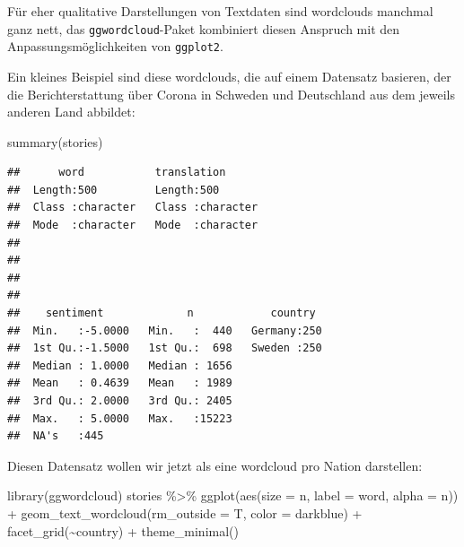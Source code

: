 \documentclass[
]{book}
\newenvironment{Shaded}{\begin{snugshade}}{\end{snugshade}}
\newcommand{\AttributeTok}[1]{\textcolor[rgb]{0.77,0.63,0.00}{#1}}
\newcommand{\FunctionTok}[1]{\textcolor[rgb]{0.00,0.00,0.00}{#1}}
\newcommand{\NormalTok}[1]{#1}
\newcommand{\SpecialCharTok}[1]{\textcolor[rgb]{0.00,0.00,0.00}{#1}}
\newcommand{\StringTok}[1]{\textcolor[rgb]{0.31,0.60,0.02}{#1}}
\begin{document}
Für eher qualitative Darstellungen von Textdaten sind wordclouds manchmal ganz nett, das \texttt{ggwordcloud}-Paket kombiniert diesen Anspruch mit den Anpassungsmöglichkeiten von \texttt{ggplot2}.

Ein kleines Beispiel sind diese wordclouds, die auf einem Datensatz basieren, der die Berichterstattung über Corona in Schweden und Deutschland aus dem jeweils anderen Land abbildet:

\begin{Shaded}
\begin{Highlighting}[]
\FunctionTok{summary}\NormalTok{(stories)}
\end{Highlighting}
\end{Shaded}

\begin{verbatim}
##      word           translation       
##  Length:500         Length:500        
##  Class :character   Class :character  
##  Mode  :character   Mode  :character  
##                                       
##                                       
##                                       
##                                       
##    sentiment             n            country   
##  Min.   :-5.0000   Min.   :  440   Germany:250  
##  1st Qu.:-1.5000   1st Qu.:  698   Sweden :250  
##  Median : 1.0000   Median : 1656                
##  Mean   : 0.4639   Mean   : 1989                
##  3rd Qu.: 2.0000   3rd Qu.: 2405                
##  Max.   : 5.0000   Max.   :15223                
##  NA's   :445
\end{verbatim}

Diesen Datensatz wollen wir jetzt als eine wordcloud pro Nation darstellen:

\begin{Shaded}
\begin{Highlighting}[]
\FunctionTok{library}\NormalTok{(ggwordcloud)}
\NormalTok{stories }\SpecialCharTok{\%\textgreater{}\%} 
  \FunctionTok{ggplot}\NormalTok{(}\FunctionTok{aes}\NormalTok{(}\AttributeTok{size =}\NormalTok{ n, }
             \AttributeTok{label =}\NormalTok{ word,}
             \AttributeTok{alpha =}\NormalTok{ n)) }\SpecialCharTok{+}
  \FunctionTok{geom\_text\_wordcloud}\NormalTok{(}\AttributeTok{rm\_outside =}\NormalTok{ T,}
                      \AttributeTok{color =} \StringTok{\textquotesingle{}darkblue\textquotesingle{}}\NormalTok{) }\SpecialCharTok{+}
  \FunctionTok{facet\_grid}\NormalTok{(}\SpecialCharTok{\textasciitilde{}}\NormalTok{country) }\SpecialCharTok{+}
  \FunctionTok{theme\_minimal}\NormalTok{()}
\end{Highlighting}
\end{Shaded}
\end{document}
